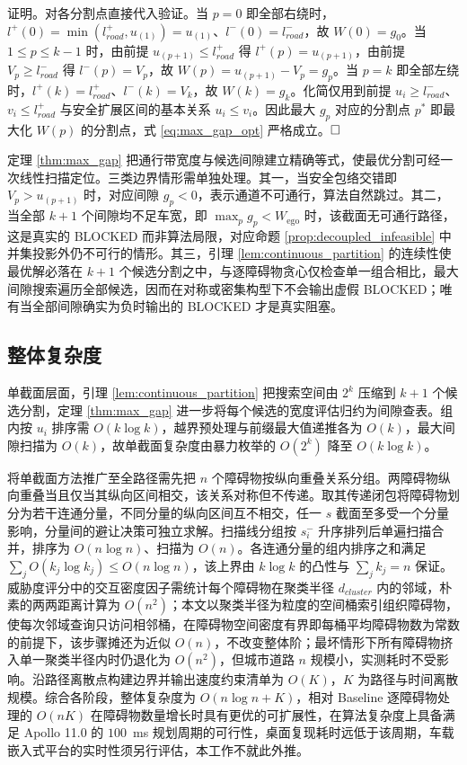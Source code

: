 \documentclass[a4paper,11pt]{ctexart}
\theoremstyle{definition}
\begin{document}
证明。对各分割点直接代入验证。当 $p = 0$ 即全部右绕时，$l^{+}(0) = \min(l_{road}^{+}, u_{(1)}) = u_{(1)}$、$l^{-}(0) = l_{road}^{-}$，故 $W(0) = g_0$。当 $1 \leq p \leq k-1$ 时，由前提 $u_{(p+1)} \leq l_{road}^{+}$ 得 $l^{+}(p) = u_{(p+1)}$，由前提 $V_p \geq l_{road}^{-}$ 得 $l^{-}(p) = V_p$，故 $W(p) = u_{(p+1)} - V_p = g_p$。当 $p = k$ 即全部左绕时，$l^{+}(k) = l_{road}^{+}$、$l^{-}(k) = V_k$，故 $W(k) = g_k$。化简仅用到前提 $u_i \geq l_{road}^{-}$、$v_i \leq l_{road}^{+}$ 与安全扩展区间的基本关系 $u_i \leq v_i$。因此最大 $g_p$ 对应的分割点 $p^{*}$ 即最大化 $W(p)$ 的分割点，式 \eqref{eq:max_gap_opt} 严格成立。$\hfill\Box$

定理 \ref{thm:max_gap} 把通行带宽度与候选间隙建立精确等式，使最优分割可经一次线性扫描定位。三类边界情形需单独处理。其一，当安全包络交错即 $V_p > u_{(p+1)}$ 时，对应间隙 $g_p < 0$，表示通道不可通行，算法自然跳过。其二，当全部 $k+1$ 个间隙均不足车宽，即 $\max_p g_p < W_{\text{ego}}$ 时，该截面无可通行路径，这是真实的 BLOCKED 而非算法局限，对应命题 \ref{prop:decoupled_infeasible} 中并集投影外仍不可行的情形。其三，引理 \ref{lem:continuous_partition} 的连续性使最优解必落在 $k+1$ 个候选分割之中，与逐障碍物贪心仅检查单一组合相比，最大间隙搜索遍历全部候选，因而在对称或密集构型下不会输出虚假 BLOCKED；唯有当全部间隙确实为负时输出的 BLOCKED 才是真实阻塞。

\subsection{整体复杂度}
\label{sec:thy_complexity}

单截面层面，引理 \ref{lem:continuous_partition} 把搜索空间由 $2^k$ 压缩到 $k+1$ 个候选分割，定理 \ref{thm:max_gap} 进一步将每个候选的宽度评估归约为间隙查表。组内按 $u_i$ 排序需 $O(k \log k)$，越界预处理与前缀最大值递推各为 $O(k)$，最大间隙扫描为 $O(k)$，故单截面复杂度由暴力枚举的 $O(2^k)$ 降至 $O(k \log k)$。

将单截面方法推广至全路径需先把 $n$ 个障碍物按纵向重叠关系分组。两障碍物纵向重叠当且仅当其纵向区间相交，该关系对称但不传递。取其传递闭包将障碍物划分为若干连通分量，不同分量的纵向区间互不相交，任一 $s$ 截面至多受一个分量影响，分量间的避让决策可独立求解。扫描线分组按 $s_i^{-}$ 升序排列后单遍扫描合并，排序为 $O(n \log n)$、扫描为 $O(n)$。各连通分量的组内排序之和满足 $\sum_j O(k_j \log k_j) \leq O(n \log n)$，该上界由 $k \log k$ 的凸性与 $\sum_j k_j = n$ 保证。威胁度评分中的交互密度因子需统计每个障碍物在聚类半径 $d_{cluster}$ 内的邻域，朴素的两两距离计算为 $O(n^2)$；本文以聚类半径为粒度的空间桶索引组织障碍物，使每次邻域查询只访问相邻桶，在障碍物空间密度有界即每桶平均障碍物数为常数的前提下，该步骤摊还为近似 $O(n)$，不改变整体阶；最坏情形下所有障碍物挤入单一聚类半径内时仍退化为 $O(n^2)$，但城市道路 $n$ 规模小，实测耗时不受影响。沿路径离散点构建边界并输出速度约束清单为 $O(K)$，$K$ 为路径与时间离散规模。综合各阶段，整体复杂度为 $O(n \log n + K)$，相对 Baseline 逐障碍物处理的 $O(nK)$ 在障碍物数量增长时具有更优的可扩展性，在算法复杂度上具备满足 Apollo 11.0 的 $100$~ms 规划周期的可行性，桌面复现耗时远低于该周期，车载嵌入式平台的实时性须另行评估，本工作不就此外推。
\end{document}
